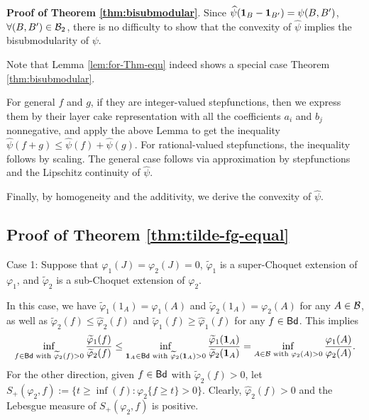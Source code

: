 \documentclass[12pt,a4paper]{article}
\newenvironment{proof}{\medskip\noindent{\bf Proof. }}{\hfill$\square$\medskip}
\begin{document}
\textbf{Proof of Theorem \ref{thm:bisubmodular}}. 
Since $\widehat{\psi}({\bf1}_{B}-{\bf1}_{B'})=\psi(B,B')$, $\forall (B,B')\in \mathcal{B}_2$, there is no difficulty to show that the convexity of $\widehat{\psi}$ implies the bisubmodularity of $\psi$. 

Note that Lemma \ref{lem:for-Thm-equ}  indeed shows a special case Theorem \ref{thm:bisubmodular}. 

For general $f$ and $g$, 
if they are integer-valued stepfunctions, then we express them by their layer cake representation with all the coefficients $a_i$ and $b_j$ nonnegative, and apply the above Lemma to get the inequality $\widehat{\psi}(f+g)\le \widehat{\psi}(f)+\widehat{\psi}(g)$. For rational-valued stepfunctions, the inequality follows by scaling. The general case follows via approximation by stepfunctions and the Lipschitz continuity of $\widehat{\psi}$.

Finally, by homogeneity and the additivity, we derive the convexity of $\widehat{\psi}$. 



\subsection{Proof of Theorem \ref{thm:tilde-fg-equal}}
\label{sec:proof-main-equal}

Case 1: Suppose that $\varphi_1(J)=\varphi_2(J)=0$, $\widetilde{\varphi}_1$ is a super-Choquet extension  of $\varphi_1$, and $\widetilde{\varphi}_2$ is a sub-Choquet extension  of $\varphi_2$.

In this case,  we have $\widetilde{\varphi}_1(1_A)=\varphi_1(A)$ and  $\widetilde{\varphi}_2(1_A)=\varphi_2(A)$ for any $A\in\mathcal{B}$, as well as $\widetilde{\varphi}_2(f)\le \widehat{\varphi}_2(f)$ and $\widetilde{\varphi}_1(f)\ge \widehat{\varphi}_1(f)$ for any $f\in{\sf Bd}$. 
This implies %
\begin{align*}
\inf_{f\in {\sf Bd} \text{ with }\widetilde{\varphi}_2(f)>0}\frac{\widetilde{\varphi}_1(f)}{\widetilde{\varphi}_2(f)}\le \inf_{{\bf1}_A\in {\sf Bd} \text{ with }\widetilde{\varphi}_2({\bf1}_A)>0}\frac{\widetilde{\varphi}_1({\bf1}_A)}{\widetilde{\varphi}_2({\bf1}_A)} =\inf_{A\in\mathcal{B}\text{ with }\varphi_2(A)>0}\frac{\varphi_1(A)}{\varphi_2(A)} .
\end{align*}
For the other direction, given  $f\in {\sf Bd} $ with $\widetilde{\varphi}_2(f)>0$, let $S_+(\varphi_2,f):=\{t\ge \inf(f): \varphi_2\{f\ge t\}>0\}$. Clearly, $\widehat{\varphi}_2(f)>0$ and the Lebesgue measure of $S_+(\varphi_2,f)$ is positive. 
\end{document}
